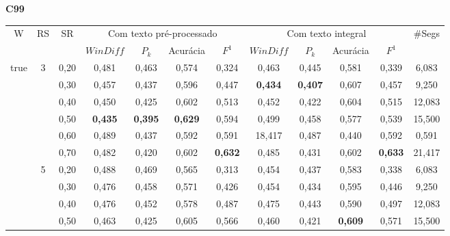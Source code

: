 
\begin{table}[!h]
	\center
	\textbf{C99}  \\
	\begin{tabular}{|c|c|c||c|c|c|c||c|c|c|c||c|} 
\hline 
\multirow{2}{*}{W} & \multirow{2}{*}{RS} & \multirow{2}{*}{SR} & \multicolumn{4}{c||}{Com texto pré-processado} & \multicolumn{4}{c||}{Com texto integral}& \multirow{2}{*}{\#Segs} \\\cline{4-11}

&& & $WinDiff$ & $P_k$ & Acurácia & $F^1$ & $WinDiff$ & $P_k$ & Acurácia & $F^1$ & \\ \hline 
 \multirow{18}{*}{true} & \multirow{6}{*}{3} 
	 & 0,20    & 0,481 & 0,463 & 0,574 & 0,324         &     0,463 &  0,445 & 0,581 & 0,339 & 6,083                \\ \cline{3-12}
	&& 0,30    & 0,457 & 0,437 & 0,596 & 0,447         &     \cellcolor{gray!20} \textbf{0,434} & \cellcolor{gray!20} \textbf{0,407} & 0,607 & 0,457 & 9,250  \\\cline{3-12} 
	&& 0,40    & 0,450 & 0,425 & 0,602 & 0,513         &     0,452 &  0,422 & 0,604 & 0,515 & 12,083              \\ \cline{3-12}                                            
	&& 0,50    & \cellcolor{gray!20} \textbf{0,435} & \cellcolor{gray!20} \textbf{0,395} & \cellcolor{gray!20} \textbf{0,629} & 0,594  &     0,499 &  0,458 & 0,577 & 0,539 & 15,500              \\ \cline{3-12}
	&& 0,60    & 0,489 & 0,437 & 0,592 & 0,591 & 18,417                                &     0,487 &  0,440 & 0,592 & 0,591               \\ \cline{3-12}                 
	&& 0,70    & 0,482 & 0,420 & 0,602 & \cellcolor{gray!20} \textbf{0,632} &    0,485 &  0,431 & 0,602 & \cellcolor{gray!20} \textbf{0,633} & 21,417 \\ \cline{2-12} 
 & \multirow{6}{*}{5} 
	  & 0,20    & 0,488 & 0,469 & 0,565 & 0,313         &     0,454 &  0,437 & 0,583 & 0,338 & 6,083               \\ \cline{3-12}                  
	 && 0,30    & 0,476 & 0,458 & 0,571 & 0,426         &     0,454 &  0,434 & 0,595 & 0,446 & 9,250               \\ \cline{3-12}                  
	 && 0,40    & 0,476 & 0,452 & 0,578 & 0,487         &     0,475 &  0,443 & 0,590 & 0,497 & 12,083              \\ \cline{3-12}                  
	 && 0,50    & 0,463 & 0,425 & 0,605 & 0,566         &     0,460 &  0,421 & \cellcolor{gray!20} \textbf{0,609} & 0,571 & 15,500  \\ \cline{3-12} 

\end{tabular}
\end{table}
